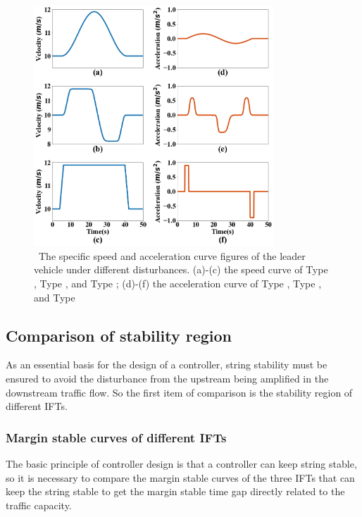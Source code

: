 \documentclass[journal]{IEEEtran}
\begin{document}
\begin{figure}
  \centering
  \includegraphics[width=9cm]{fig_S5.2.png}
  \caption{~The specific speed and acceleration curve figures of the leader vehicle under different disturbances. (a)-(c) the speed curve of {Type \uppercase\expandafter{}}, {Type \uppercase\expandafter{}}, and {Type \uppercase\expandafter{}}; (d)-(f) the acceleration curve of {Type \uppercase\expandafter{}}, {Type \uppercase\expandafter{}}, and {Type \uppercase\expandafter{}}} 
  \label{Figure5.2}
\end{figure}


\subsection{Comparison of stability region}
\label{Section 5.2}
As an essential basis for the design of a controller, string stability must be ensured to avoid the disturbance from the upstream being amplified in the downstream traffic flow. So the first item of comparison is the stability region of different IFTs.

\subsubsection{Margin stable curves of different IFTs}
\label{Section 5.2.1}
The basic principle of controller design is that a controller can keep string stable, so it is necessary to compare the margin stable curves of the three IFTs that can keep the string stable to get the margin stable time gap directly related to the traffic capacity.
\end{document}
